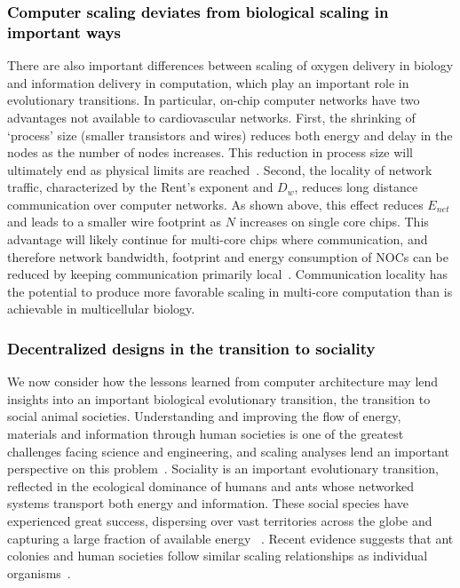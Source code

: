 \documentclass[12pt]{article}
\newcommand{\red}[1]{\textcolor{black}{#1}}
\begin{document}
\red{\subsubsection{Computer scaling deviates from biological scaling in important ways}} There are also important differences between scaling of oxygen delivery in biology and information
delivery in computation, which play an important role in evolutionary
transitions. In particular, on-chip computer networks have two advantages not
available to cardiovascular networks.  First, the shrinking of
`process' size (smaller
transistors and wires) reduces both energy and
delay in the nodes as the number of nodes increases.
This reduction in process size will ultimately end
as physical limits are reached~\cite{waldrop2016chips}.
Second, the locality of
network traffic, characterized by the Rent's exponent and $D_w$, reduces long
distance communication over computer networks. As shown above, this
effect
reduces $E_{net}$ and leads to a smaller wire footprint as $N$
increases on single core chips. This advantage will likely continue for
multi-core chips where communication, and therefore network bandwidth,
footprint and energy consumption of NOCs can be reduced by keeping
communication primarily local~\cite{bezerra2010modeling, zarkesh2010hybrid}. Communication locality
has the potential to produce more favorable scaling in multi-core
computation than is achievable in multicellular biology.

\red{\subsubsection{Decentralized designs in the transition to sociality}}  We now
consider how the lessons learned from computer architecture may lend insights into an important
biological evolutionary transition, the transition to social animal societies. Understanding and improving the flow of energy, materials and information through human societies is one of the greatest challenges facing science and engineering, and scaling analyses lend an important perspective on this problem~\cite{moses2012beyond}.
Sociality is an important evolutionary transition, reflected in the
ecological dominance of humans and ants whose networked
systems transport both energy and information. These social species have experienced great success, dispersing over vast territories across the globe and capturing a large
fraction of available energy ~\cite{haberl2007quantifying, holldobler1990ants}. Recent evidence suggests that ant colonies and human societies follow similar scaling relationships as individual organisms~\cite{moses2003allometry, bettencourt2007growth, burnside2012human, hou2010energetic, waters2010allometric}. 
\end{document}
